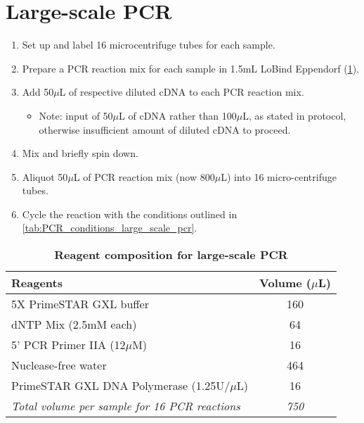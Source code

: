 \section{Large-scale PCR} 
\label{Isoseq_Protocol_largescalepcr}
\begin{enumerate}
	\item Set up and label 16 microcentrifuge tubes for each sample. 
	\item Prepare a PCR reaction mix for each sample in 1.5mL LoBind Eppendorf (\cref{tab:large_scale_pcr}).
	\item Add 50$\mu$L of respective diluted cDNA to each PCR reaction mix. 
	\begin{itemize}
		\item Note: input of 50$\mu$L of cDNA rather than 100$\mu$L, as stated in protocol, otherwise insufficient amount of diluted cDNA to proceed.
	\end{itemize}
	\item Mix and briefly spin down.
	\item Aliquot 50$\mu$L of PCR reaction mix (now 800$\mu$L) into 16 micro-centrifuge tubes.
	\item Cycle the reaction with the conditions outlined in \cref{tab:PCR_conditions_large_scale_pcr}.
\end{enumerate}

\vspace{1cm}
\begin{table}[ht]
	\centering
	\caption[Large-scale PCR]%
	{\textbf{Reagent composition for large-scale PCR}}
	\label{tab:large_scale_pcr}
	\begin{tabularx}{0.8\textwidth}{lc}
		\toprule 
		Reagents                                     & Volume ($\mu$L) \\ \midrule
		5X PrimeSTAR GXL buffer                      & 160         \\
		dNTP Mix (2.5mM each)                        & 64          \\
		5' PCR Primer IIA (12$\mu$M)                      & 16          \\
		Nuclease-free water                          & 464         \\
		PrimeSTAR GXL DNA Polymerase (1.25U/$\mu$L)             & 16          \\
		\textit{Total volume per sample for 16 PCR reactions} & \textit{750} \\
		\bottomrule        
	\end{tabularx}
\end{table}


